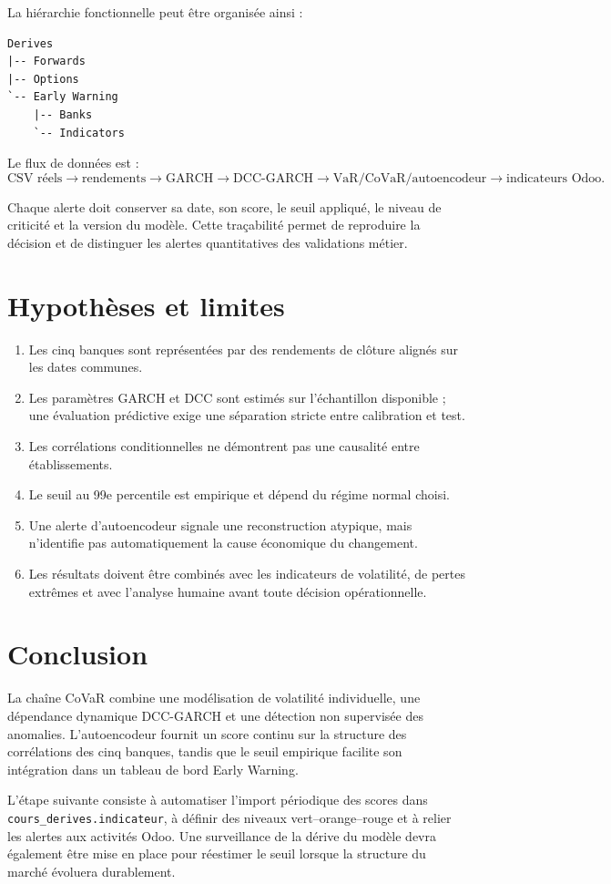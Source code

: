 \documentclass[12pt,a4paper]{article}
\begin{document}
La hiérarchie fonctionnelle peut être organisée ainsi :

\begin{lstlisting}
Derives
|-- Forwards
|-- Options
`-- Early Warning
    |-- Banks
    `-- Indicators
\end{lstlisting}

Le flux de données est :
\[
\text{CSV réels}
\rightarrow
\text{rendements}
\rightarrow
\text{GARCH}
\rightarrow
\text{DCC-GARCH}
\rightarrow
\text{VaR/CoVaR/autoencodeur}
\rightarrow
\text{indicateurs Odoo}.
\]

Chaque alerte doit conserver sa date, son score, le seuil appliqué, le niveau de criticité et la
version du modèle. Cette traçabilité permet de reproduire la décision et de distinguer les
alertes quantitatives des validations métier.

\section{Hypothèses et limites}

\begin{enumerate}
  \item Les cinq banques sont représentées par des rendements de clôture alignés sur les dates
        communes.
  \item Les paramètres GARCH et DCC sont estimés sur l'échantillon disponible ; une évaluation
        prédictive exige une séparation stricte entre calibration et test.
  \item Les corrélations conditionnelles ne démontrent pas une causalité entre établissements.
  \item Le seuil au 99e percentile est empirique et dépend du régime normal choisi.
  \item Une alerte d'autoencodeur signale une reconstruction atypique, mais n'identifie pas
        automatiquement la cause économique du changement.
  \item Les résultats doivent être combinés avec les indicateurs de volatilité, de pertes
        extrêmes et avec l'analyse humaine avant toute décision opérationnelle.
\end{enumerate}

\section{Conclusion}

La chaîne CoVaR combine une modélisation de volatilité individuelle, une dépendance dynamique
DCC-GARCH et une détection non supervisée des anomalies. L'autoencodeur fournit un score continu
sur la structure des corrélations des cinq banques, tandis que le seuil empirique facilite son
intégration dans un tableau de bord Early Warning.

L'étape suivante consiste à automatiser l'import périodique des scores dans
\texttt{cours\_derives.indicateur}, à définir des niveaux vert--orange--rouge et à relier les alertes
aux activités Odoo. Une surveillance de la dérive du modèle devra également être mise en place
pour réestimer le seuil lorsque la structure du marché évoluera durablement.
\end{document}
